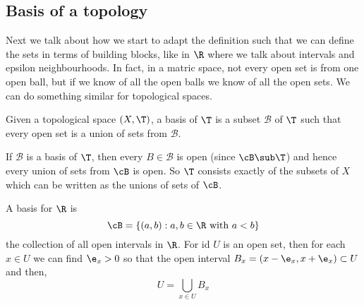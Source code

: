 \noindent
\subsection{Basis of a topology}

Next we talk about how we start to adapt the definition such that we can define the sets in terms of building blocks, like in $\R$ where we talk about intervals and epsilon neighbourhoods. In fact, in a matric space, not every open set is from one open ball, but if we know of all the open balls we know of all the open sets. We can do something similar for topological spaces.

\begin{ndefi}[Basis]
  Given a topological space $(X, \T)$, a basis of $\T$ is a subset $\mathcal{B}$ of $\T$ such that every open set is a union of sets from $\mathcal{B}$.
\end{ndefi}
\begin{remark}
   If $\mathcal{B}$ is a basis of $\T$, then every $B \in \mathcal{B}$ is open (since $\cB \sub \T$) and hence every union of sets from $\cB$ is open. So $\T$ consists exactly of the subsets of $X$ which can be written as the unions of sets of $\cB$.
\end{remark}

\begin{eg}
  A basis for $\R$ is
  $$ \cB = \{(a, b) : a, b \in \R \text{ with } a < b\} $$
  the collection of all open intervals in $\R$. For id $U$ is an open set, then for each $x \in U$ we can find $\e_x > 0$ so that the open interval $B_x = (x - \e_x, x + \e_x) \subset U$ and then,
  $$ U= \bigcup_{x \in U} B_x$$
\end{eg}

